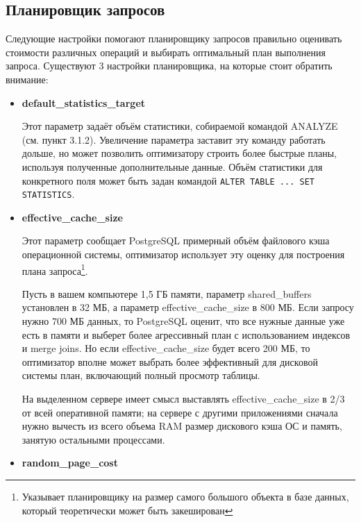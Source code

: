\subsection{Планировщик запросов}

Следующие настройки помогают планировщику запросов правильно оценивать стоимости различных операций и выбирать оптимальный план выполнения запроса. Существуют 3 настройки планировщика, на которые стоит обратить внимание:

\begin{itemize}
  \item \textbf{default\_statistics\_target}

  Этот параметр задаёт объём статистики, собираемой командой ANALYZE (см. пункт 3.1.2). Увеличение параметра заставит эту команду работать дольше, но может позволить оптимизатору строить более быстрые планы, используя полученные дополнительные данные. Объём статистики для конкретного поля может быть задан командой \lstinline!ALTER TABLE ... SET STATISTICS!.

  \item \textbf{effective\_cache\_size}

  Этот параметр сообщает PostgreSQL примерный объём файлового кэша операционной системы, оптимизатор использует эту оценку для построения плана запроса\footnote{Указывает планировщику на размер самого большого объекта в базе данных, который теоретически может быть закеширован}.

Пусть в вашем компьютере 1,5 ГБ памяти, параметр shared\_buffers установлен в 32 МБ, а параметр effective\_cache\_size в 800 МБ. Если запросу нужно 700 МБ данных, то PostgreSQL оценит, что все нужные данные уже есть в памяти и выберет более агрессивный план с использованием индексов и merge joins. Но если effective\_cache\_size будет всего 200 МБ, то оптимизатор вполне может выбрать более эффективный для дисковой системы план, включающий полный просмотр таблицы.

На выделенном сервере имеет смысл выставлять effective\_cache\_size в 2/3 от всей оперативной памяти; на сервере с другими приложениями сначала нужно вычесть из всего объема RAM размер дискового кэша ОС и память, занятую остальными процессами.

  \item \textbf{random\_page\_cost}


\end{itemize}
